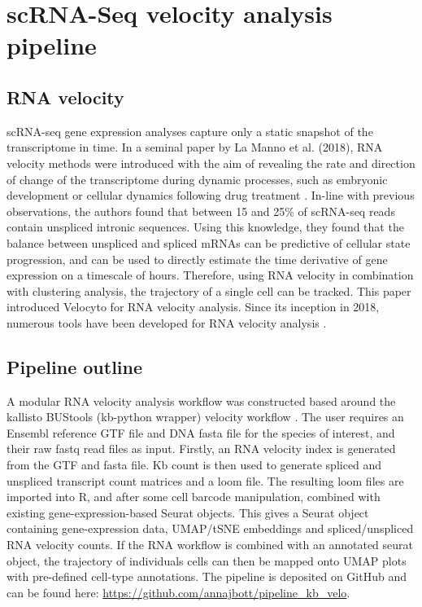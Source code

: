 \afterpage{\clearpage}
\section{scRNA-Seq velocity analysis pipeline}

\subsection{RNA velocity}
scRNA-seq gene expression analyses capture only a static snapshot of the transcriptome in time.
In a seminal paper by La Manno et al. (2018), RNA velocity methods were introduced with the aim of revealing the rate and direction of change of the transcriptome during dynamic processes, such as embryonic development or cellular dynamics following drug treatment \cite{la2018rna}.
In-line with previous observations, the authors found that between 15 and 25\% of scRNA-seq reads contain unspliced intronic sequences.
Using this knowledge, they found that the balance between unspliced and spliced mRNAs can be predictive of cellular state progression, and can be used to directly estimate the time derivative of gene expression on a timescale of hours.
Therefore, using RNA velocity in combination with clustering analysis, the trajectory of a single cell can be tracked.
This paper introduced Velocyto for RNA velocity analysis.
Since its inception in 2018, numerous tools have been developed for RNA velocity analysis \cite{la2018rna, weng2021vetra, bergen2020generalizing, melsted2019modular}.

\subsection{Pipeline outline}
A modular RNA velocity analysis workflow was constructed based around the kallisto BUStools (kb-python wrapper) velocity workflow \cite{melsted2019modular}.
The user requires an Ensembl reference GTF file and DNA fasta file for the species of interest, and their raw fastq read files as input.
Firstly, an RNA velocity index is generated from the GTF and fasta file.
Kb count is then used to generate spliced and unspliced transcript count matrices and a loom file.
The resulting loom files are imported into R, and after some cell barcode manipulation, combined with existing gene-expression-based Seurat objects.
This gives a Seurat object containing gene-expression data, UMAP/tSNE embeddings and spliced/unspliced RNA velocity counts.
If the RNA workflow is combined with an annotated seurat object, the trajectory of individuals cells can then be mapped onto UMAP plots with pre-defined cell-type annotations.
The pipeline is deposited on GitHub and can be found here: \url{https://github.com/annajbott/pipeline_kb_velo}.

\afterpage{\clearpage}
